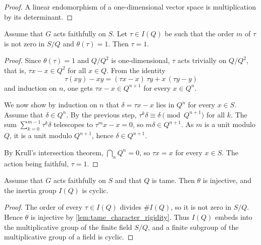 \begin{proof}
  \leanok
  A linear endomorphism of a one-dimensional vector space is multiplication by its determinant.
\end{proof}

\begin{lemma}[Rigidity]
  \label{lem:tame_character_rigidity}
  \leanok
  Assume that $G$ acts faithfully on $S$. Let $\tau \in I(Q)$ be such that the order $m$ of $\tau$
  is not zero in $S/Q$ and $\theta(\tau) = 1$. Then $\tau = 1$.
\end{lemma}

\begin{proof}
  \leanok
  Since $\theta(\tau) = 1$ and $Q/Q^2$ is one-dimensional, $\tau$ acts trivially on $Q/Q^2$, that
  is, $\tau x - x \in Q^2$ for all $x \in Q$. From the identity
  \[
    \tau(xy) - xy = (\tau x - x)\,\tau y + x\,(\tau y - y)
  \]
  and induction on $n$, one gets $\tau x - x \in Q^{n+1}$ for every $x \in Q^n$.

  We now show by induction on $n$ that $\delta = \tau x - x$ lies in $Q^n$ for every $x \in S$.
  Assume that $\delta \in Q^n$. By the previous step, $\tau^k \delta \equiv \delta \pmod{Q^{n+1}}$
  for all $k$. The sum $\sum_{k=0}^{m-1} \tau^k \delta$ telescopes to $\tau^m x - x = 0$, so
  $m\delta \in Q^{n+1}$. As $m$ is a unit modulo $Q$, it is a unit modulo $Q^{n+1}$, hence
  $\delta \in Q^{n+1}$.

  By Krull's intersection theorem, $\bigcap_n Q^n = 0$, so $\tau x = x$ for every $x \in S$.
  The action being faithful, $\tau = 1$.
\end{proof}

\begin{lemma}
  \label{lem:tame_inertia_cyclic}
  \leanok
  Assume that $G$ acts faithfully on $S$ and that $Q$ is tame. Then $\theta$ is injective, and the
  inertia group $I(Q)$ is cyclic.
\end{lemma}

\begin{proof}
  \leanok
  The order of every $\tau \in I(Q)$ divides $\#I(Q)$, so it is not zero in $S/Q$. Hence $\theta$
  is injective by \ref{lem:tame_character_rigidity}. Thus $I(Q)$ embeds into the multiplicative
  group of the finite field $S/Q$, and a finite subgroup of the multiplicative group of a field is
  cyclic.
\end{proof}

